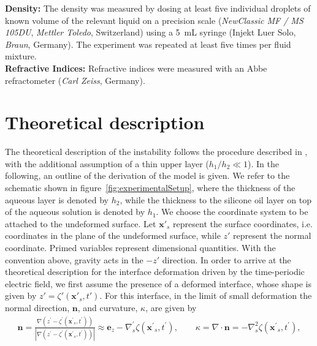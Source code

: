\documentclass{jfm_arxiv}
\newcommand{\xsp}{\mathbf{x^\prime}_s}
\newcommand{\zp}{z^\prime}
\newcommand{\tp}{t^\prime}
\newcommand{\nablap}{\nabla^\prime}
\newcommand{\zetap}{\zeta^\prime}
\begin{document}
\textbf{Density:}
The density was measured by dosing at least five individual droplets of known volume of the relevant liquid on a precision scale (\textit{NewClassic MF / MS 105DU}, \textit{Mettler Toledo}, Switzerland) using a \SI{5}{\milli \liter} syringe (Injekt Luer Solo, \textit{Braun}, Germany).
The experiment was repeated at least five times per fluid mixture.\\

\textbf{Refractive Indices:}
Refractive indices were measured with an Abbe refractometer (\textit{Carl Zeiss}, Germany).

\section{Theoretical description}
\label{sec:appB-Theory}

The theoretical description of the instability follows the procedure described in \citet{Bandopadhyay2017}, with the additional assumption of a thin upper layer ($h_1/h_2 \ll 1$).
In the following, an outline of the derivation of the model is given.
We refer to the schematic shown in figure~\ref{fig:experimentalSetup}, where the thickness of the aqueous layer is denoted by $h_2$, while the thickness to the silicone oil layer on top of the aqueous solution is denoted by $h_1$.
We choose the coordinate system to be attached to the undeformed surface. Let $\mathbf{x}'_s$ represent the surface coordinates, i.e. coordinates in the plane of the undeformed surface, while $z'$ represent the normal coordinate. Primed variables represent dimensional quantities.
With the convention above, gravity acts in the $-z'$ direction.
In order to arrive at the theoretical description for the interface deformation driven by the time-periodic electric field, we first assume the presence of a deformed interface, whose shape is given by $z' = \zeta'(\mathbf{x}'_s, t')$.
For this interface, in the limit of small deformation the normal direction, $\mathbf{n}$, and curvature, $\kappa$, are given by
\begin{eqnarray}
\mathbf{n} = \frac{\nabla (\zp-\zetap(\xsp,\tp))}{|\nabla (\zp-\zetap(\xsp,\tp))|} \approx
\mathbf{e}_z - \nablap_s \zeta(\xsp,\tp), \qquad \kappa = \nabla\cdot \mathbf{n} =
-\nabla_s^2 \zeta(\xsp,\tp),
\end{eqnarray}
\end{document}
